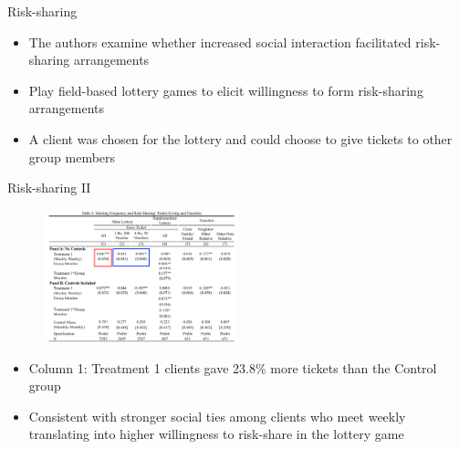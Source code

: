 \documentclass[11pt,notes=hide,aspectratio=169,mathserif]{beamer}
\begin{document}
\begin{frame}{Risk-sharing}
\begin{itemize}
    \item The authors examine whether increased social interaction facilitated risk-sharing arrangements 
    \pause \item Play field-based lottery games to elicit willingness to form risk-sharing arrangements
    \pause \item A client was chosen for the lottery and could choose to give tickets to other group members
\end{itemize}
\end{frame}

\begin{frame}{Risk-sharing II}
\begin{figure}
    \centering
    \includegraphics[width=0.5\textwidth]{inputs/table3.png}
\end{figure}
\begin{itemize}
    \item Column 1: Treatment 1 clients gave 23.8\% more tickets than the Control group 
    \pause \item Consistent with stronger social ties among clients who meet weekly translating into higher willingness to risk-share in the lottery game
\end{itemize}
\end{frame}
\end{document}
